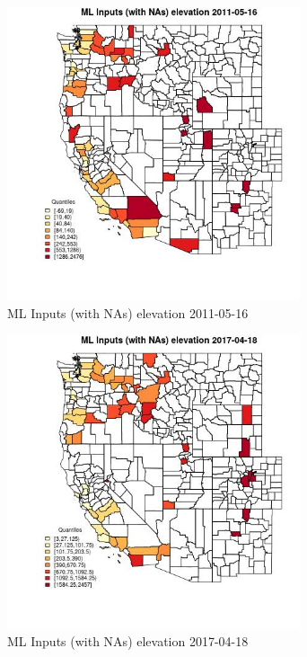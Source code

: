 \begin{figure} 
\centering  
\includegraphics[width=0.77\textwidth]{Code_Outputs/Report_ML_input_PM25_Step4_part_e_de_duplicated_aveswNAs_CountyelevationMean2011-05-16_2011-05-16.jpg} 
\caption{\label{fig:Report_ML_input_PM25_Step4_part_e_de_duplicated_aveswNAsCountyelevationMean2011-05-16_2011-05-16}ML Inputs (with NAs) elevation 2011-05-16} 
\end{figure} 
 

\begin{figure} 
\centering  
\includegraphics[width=0.77\textwidth]{Code_Outputs/Report_ML_input_PM25_Step4_part_e_de_duplicated_aveswNAs_CountyelevationMean2017-04-18_2017-04-18.jpg} 
\caption{\label{fig:Report_ML_input_PM25_Step4_part_e_de_duplicated_aveswNAsCountyelevationMean2017-04-18_2017-04-18}ML Inputs (with NAs) elevation 2017-04-18} 
\end{figure} 
 

